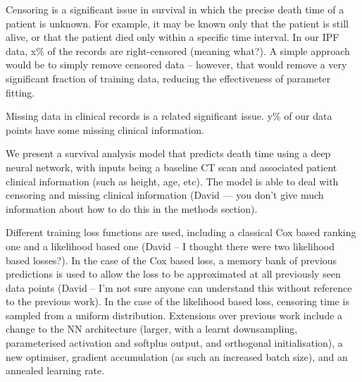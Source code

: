     Censoring is a significant issue in survival in which the precise death time of a patient is unknown. For example, it may be known only that the patient is still alive, or that the patient died only within a specific time interval. In our \gls{IPF} data, x\% of the records are right-censored (meaning what?). A simple approach would be to simply remove censored data -- however, that would remove a very significant fraction of training data, reducing the effectiveness of parameter fitting.%
    
    Missing data in clinical records is a related significant issue. y\% of our data points have some missing clinical information. 

    We present a survival analysis model that predicts death time using a deep neural network, with inputs being a baseline \gls{CT} scan and associated patient clinical information (such as height, age, etc). The model is able to deal with censoring and missing clinical information (David --- you don't give much information about how to do this in the methods section).
    
    Different training loss functions are used, including a classical Cox based ranking one and a likelihood based one (David -- I thought there were two likelihood based losses?). In the case of the Cox based loss, a memory bank of previous predictions is used to allow the loss to be approximated at all previously seen data points (David -- I'm not sure anyone can understand this without reference to the previous work). In the case of the likelihood based loss, censoring time is sampled from a uniform distribution. Extensions over previous work \cite{} include a change to the \gls{NN} architecture (larger, with a learnt downsampling, parameterised activation and softplus output, and orthogonal initialisation), a new optimiser, gradient accumulation (as such an increased batch size), and an annealed learning rate.
